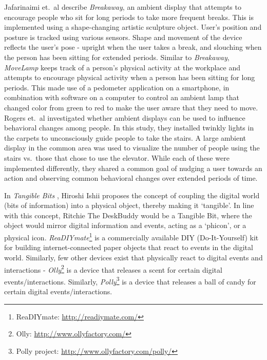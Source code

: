 \documentclass{sigchi-ext}
\begin{document}
Jafarinaimi et.\ al \cite{jafarinaimi2005breakaway} describe
\textit{Breakaway}, an ambient display that attempts to encourage people who
sit for long periods to take more frequent breaks. This is implemented using a
shape-changing artistic sculpture object. User's position and posture is
tracked using various sensors. Shape and movement of the device reflects the
user's pose - upright when the user takes a break, and slouching when the
person has been sitting for extended periods. Similar to \textit{Breakaway},
\textit{MoveLamp} \cite{fortmann2013make} keeps track of a person's physical
activity at the workplace and attempts to encourage physical activity when a
person has been sitting for long periods. This made use of a pedometer
application on a smartphone, in combination with software on a computer to
control an ambient lamp that changed color from green to red to make the user
aware that they need to move. Rogers et.\ al \cite{rogers2010ambient}
investigated whether ambient displays can be used to influence behavioral
changes among people. In this study, they installed twinkly lights in the
carpets to unconsciously guide people to take the stairs. A large ambient
display in the common area was used to visualize the number of people using the
stairs vs.\ those that chose to use the elevator. While each of these were
implemented differently, they shared a common goal of nudging a user towards an
action and observing common behavioral changes over extended periods of time.

In \textit{Tangible Bits} \cite{ishii1997tangible}, Hiroshi Ishii proposes the
concept of coupling the digital world (bits of information) into a physical
object, thereby making it `tangible'. In line with this concept, Ritchie The
DeskBuddy would be a Tangible Bit, where the object would mirror digital
information and events, acting as a `phicon', or a physical icon.
\textit{ReaDIYmate}\footnote{ReaDIYmate: \url{http://readiymate.com/}} is a
commercially available DIY (Do-It-Yourself) kit for building internet-connected
paper objects that react to events in the digital world.  Similarly, few other
devices exist that physically react to digital events and interactions -
\textit{Olly}\footnote{Olly: \url{http://www.ollyfactory.com/}} is a device that
releases a scent for certain digital events/interactions. Similarly,
\textit{Polly}\footnote{Polly project: \url{http://www.ollyfactory.com/polly/}} is a
device that releases a ball of candy for certain digital events/interactions.

\end{document}
